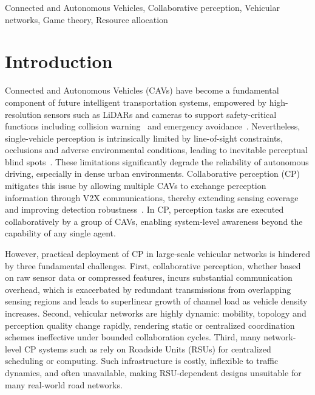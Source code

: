 \documentclass[conference]{IEEEtran}
\begin{document}
\begin{IEEEkeywords}
Connected and Autonomous Vehicles, Collaborative perception, Vehicular networks, Game theory, Resource allocation
\end{IEEEkeywords}


\section{Introduction}

Connected and Autonomous Vehicles (CAVs) have become a fundamental component of future intelligent transportation systems, empowered by high-resolution sensors such as LiDARs and cameras to support safety-critical functions including collision warning~\cite{lin2015blind} and emergency avoidance~\cite{cui2022coopernaut}. Nevertheless, single-vehicle perception is intrinsically limited by line-of-sight constraints, occlusions and adverse environmental conditions, leading to inevitable perceptual blind spots~\cite{xu2022behind}. These limitations significantly degrade the reliability of autonomous driving, especially in dense urban environments.
Collaborative perception (CP) mitigates this issue by allowing multiple CAVs to exchange perception information through V2X communications, thereby extending sensing coverage and improving detection robustness~\cite{wang2020v2vnet,kim2015impact}. In CP, perception tasks are executed collaboratively by a group of CAVs, enabling system-level awareness beyond the capability of any single agent.

However, practical deployment of CP in large-scale vehicular networks is hindered by three fundamental challenges. First, collaborative perception, whether based on raw sensor data or compressed features, incurs substantial communication overhead, which is exacerbated by redundant transmissions from overlapping sensing regions and leads to superlinear growth of channel load as vehicle density increases\cite{liang2025fullperception}. Second, vehicular networks are highly dynamic: mobility, topology and perception quality change rapidly\cite{yang2023what2comm}, rendering static or centralized coordination schemes ineffective under bounded collaboration cycles. Third, many network-level CP systems such as \cite{zhang2021emp,luo2023edgecooper,liang2025fullperception} rely on Roadside Units (RSUs) for centralized scheduling or computing. Such infrastructure is costly, inflexible to traffic dynamics, and often unavailable, making RSU-dependent designs unsuitable for many real-world road networks.
\end{document}
